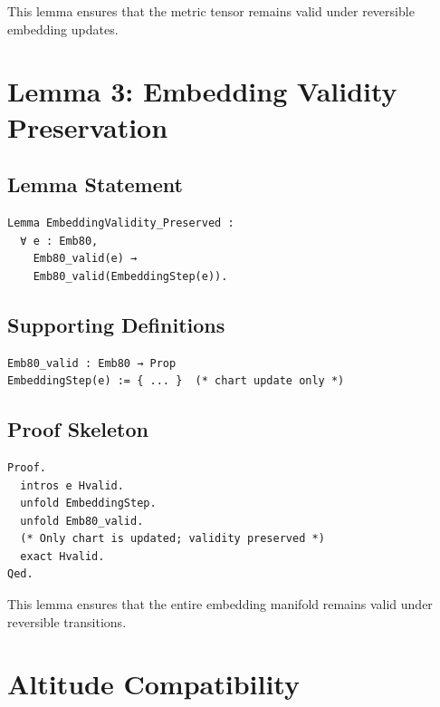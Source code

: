 \documentclass[11pt]{article}
\begin{document}
This lemma ensures that the metric tensor remains valid under reversible
embedding updates.

\newpage


\section{Lemma 3: Embedding Validity Preservation}

\subsection{Lemma Statement}

\begin{verbatim}
Lemma EmbeddingValidity_Preserved :
  ∀ e : Emb80,
    Emb80_valid(e) →
    Emb80_valid(EmbeddingStep(e)).
\end{verbatim}

\subsection{Supporting Definitions}

\begin{verbatim}
Emb80_valid : Emb80 → Prop
EmbeddingStep(e) := { ... }  (* chart update only *)
\end{verbatim}

\subsection{Proof Skeleton}

\begin{verbatim}
Proof.
  intros e Hvalid.
  unfold EmbeddingStep.
  unfold Emb80_valid.
  (* Only chart is updated; validity preserved *)
  exact Hvalid.
Qed.
\end{verbatim}

This lemma ensures that the entire embedding manifold remains valid under
reversible transitions.

\newpage


\section{Altitude Compatibility}
\end{document}
